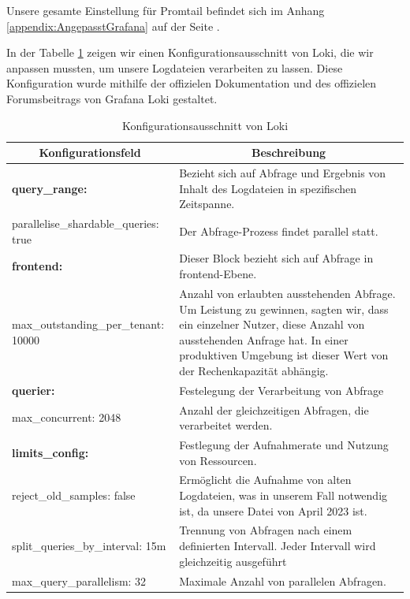 Unsere gesamte Einstellung für Promtail befindet sich im Anhang \ref{appendix:AngepasstGrafana} auf der Seite \pageref{appendix:AngepasstGrafana}.

In der Tabelle \ref{tab:KonfigLoki} zeigen wir einen Konfigurationsausschnitt von Loki, die wir anpassen mussten, um unsere Logdateien verarbeiten zu lassen. Diese Konfiguration wurde mithilfe der offizielen Dokumentation \citep{Grafana_ConfigLoki} und des offizielen Forumsbeitrags von Grafana Loki \citep{githubforum} gestaltet.

\begin{table}[H]
  \begin{tabularx}{\textwidth}{|m{6cm}|X|}
  \hline
  \multicolumn{1}{|c|}{\textbf{Konfigurationsfeld}} & \multicolumn{1}{|c|}{\textbf{Beschreibung}} \\
  \hline
  \textbf{query\_range:} & Bezieht sich auf Abfrage und Ergebnis von Inhalt des Logdateien in spezifischen Zeitspanne. \\
  \hphantom{te}parallelise\_shardable\_queries: true & Der Abfrage-Prozess findet parallel statt.\\ \hline

  \textbf{frontend:} & Dieser Block bezieht sich auf Abfrage in \gls{frontend}-Ebene. \\
  \hphantom{te}max\_outstanding\_per\_tenant: 10000 & Anzahl von erlaubten  ausstehenden Abfrage. Um Leistung zu gewinnen, sagten wir, dass ein einzelner Nutzer, diese Anzahl von ausstehenden Anfrage hat. In einer produktiven Umgebung ist dieser Wert von der Rechenkapazität abhängig.\\ \hline

  \textbf{querier:} & Festelegung der Verarbeitung von Abfrage \\ 
  \hphantom{te}max\_concurrent: 2048 & Anzahl der gleichzeitigen Abfragen, die verarbeitet werden. \\ \hline

  \textbf{limits\_config:} & Festlegung der Aufnahmerate und Nutzung von Ressourcen. \\ 
  \hphantom{te}reject\_old\_samples: false & Ermöglicht die Aufnahme von alten Logdateien, was in unserem Fall notwendig ist, da unsere Datei von April 2023 ist. \\ 
  \hphantom{te}split\_queries\_by\_interval: 15m & Trennung von Abfragen nach einem definierten Intervall. Jeder Intervall wird gleichzeitig ausgeführt \\ 
  \hphantom{te}max\_query\_parallelism: 32 & Maximale Anzahl von parallelen Abfragen.  \\ \hline

  \end{tabularx}
  \caption[Konfigurationsausschnitt von Loki]
  {Konfigurationsausschnitt von Loki}
  \label{tab:KonfigLoki}
\end{table}

